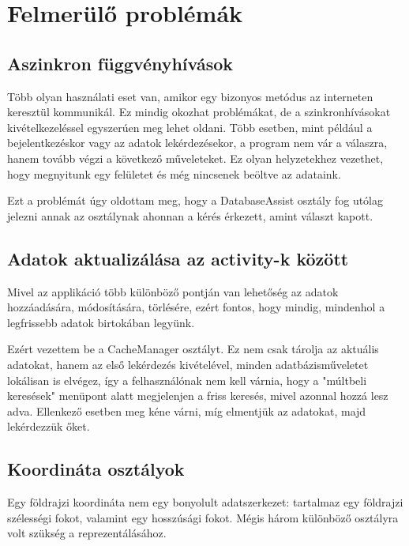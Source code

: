 \section{Felmerülő problémák}\label{sec:ALAP:adatelem}


\subsection{Aszinkron függvényhívások}\label{sec:ALAP:adatelem}

Több olyan használati eset van, amikor egy bizonyos metódus az interneten keresztül kommunikál. Ez mindig okozhat problémákat, de a szinkronhívásokat kivételkezeléssel egyszerúen meg lehet oldani. Több esetben, mint például a bejelentkezéskor vagy az adatok lekérdezésekor, a program nem vár a válaszra, hanem tovább végzi a következő műveleteket. Ez olyan helyzetekhez vezethet, hogy megnyitunk egy felületet és még nincsenek beöltve az adataink. 

Ezt a problémát úgy oldottam meg, hogy a DatabaseAssist osztály fog utólag jelezni annak az osztálynak ahonnan a kérés érkezett, amint választ kapott.


\subsection{Adatok aktualizálása az activity-k között}\label{sec:ALAP:adatelem}

Mivel az applikáció több különböző pontján van lehetőség az adatok hozzáadására, módosítására, törlésére, ezért fontos, hogy mindig, mindenhol a legfrissebb adatok birtokában legyünk.

Ezért vezettem be a CacheManager osztályt. Ez nem csak tárolja az aktuális adatokat, hanem az első lekérdezés kivételével, minden adatbázisműveletet lokálisan is elvégez, így a felhasználónak nem kell várnia, hogy a "múltbeli keresések" menüpont alatt megjelenjen a friss keresés, mivel azonnal hozzá lesz adva. Ellenkező esetben meg kéne várni, míg elmentjük az adatokat, majd lekérdezzük őket.

\subsection{Koordináta osztályok}

Egy földrajzi koordináta nem egy bonyolult adatszerkezet: tartalmaz egy földrajzi szélességi fokot, valamint egy hosszúsági fokot. Mégis három különböző osztályra volt szükség a reprezentálásához. 

